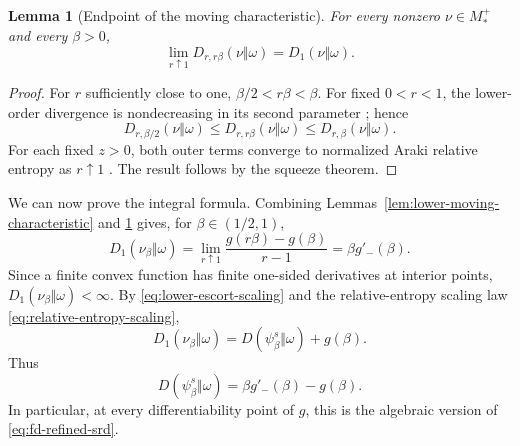 \documentclass[12pt]{article}
\numberwithin{equation}{section}
\newtheorem{lemma}[theorem]{Lemma}
\theoremstyle{definition}
\theoremstyle{remark}
\newcommand{\?}{\overset{?}{=}}
\begin{document}
\begin{lemma}[Endpoint of the moving characteristic]
\label{lem:lower-moving-endpoint}
For every nonzero $\nu\in M_*^+$ and every $\beta>0$,
\begin{equation}
  \lim_{r\uparrow1}D_{r,r\beta}(\nu\Vert\omega)
  =D_1(\nu\Vert\omega).
  \label{eq:lower-moving-endpoint}
\end{equation}
\end{lemma}

\begin{proof}
For $r$ sufficiently close to one,
$\beta/2<r\beta<\beta$.  For fixed $0<r<1$, the lower-order divergence
is nondecreasing in its second parameter
\cite[Theorem~5.1]{Hiai:2024qve}; hence
\begin{equation}
  D_{r,\beta/2}(\nu\Vert\omega)
  \leq D_{r,r\beta}(\nu\Vert\omega)
  \leq D_{r,\beta}(\nu\Vert\omega).
  \label{eq:lower-moving-squeeze}
\end{equation}
For each fixed $z>0$, both outer terms converge to normalized Araki
relative entropy as $r\uparrow1$
\cite[Theorem~6.7]{Hiai:2024qve}.  The result follows by the squeeze theorem.
\end{proof}

We can now prove the integral formula.  Combining
Lemmas~\ref{lem:lower-moving-characteristic} and
\ref{lem:lower-moving-endpoint} gives, for
$\beta\in(1/2,1)$,
\begin{equation}
  D_1(\nu_\beta\Vert\omega)
  =\lim_{r\uparrow1}
   \frac{g(r\beta)-g(\beta)}{r-1}
  =\beta g'_-(\beta).
  \label{eq:lower-left-derivative}
\end{equation}
Since a finite convex function has finite one-sided derivatives at interior points, $ D_1(\nu_\beta\Vert\omega)<\infty$.
By \eqref{eq:lower-escort-scaling} and the relative-entropy scaling law
\eqref{eq:relative-entropy-scaling},
\begin{equation}
  D_1(\nu_\beta\Vert\omega)
  =D(\psi_\beta^s\Vert\omega)+g(\beta).
  \label{eq:lower-relative-entropy-scaling}
\end{equation}
Thus
\begin{equation}
  D(\psi_\beta^s\Vert\omega)
  =\beta g'_-(\beta)-g(\beta).
  \label{eq:lower-one-sided-refined}
\end{equation}
In particular, at every differentiability point of $g$, this is the
algebraic version of \eqref{eq:fd-refined-srd}.
\end{document}
